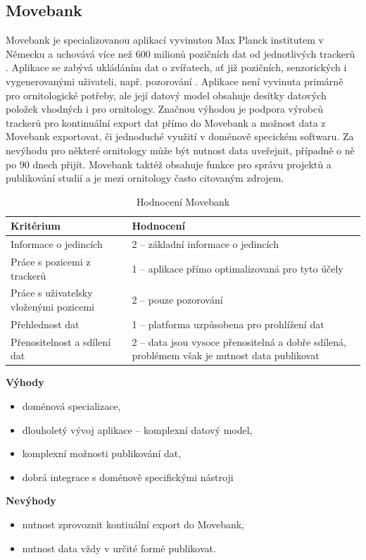 \subsection{Movebank}

Movebank je specializovanou aplikací vyvinutou Max Planck institutem v Německu a uchovává více než 600 milionů pozičních dat od jednotlivých trackerů  \cite{mrozewski2018movebank}. Aplikace se zabývá ukládáním dat o zvířatech, ať již pozičních, senzorických i vygenerovanými uživateli, např. pozorování \cite{kranstauber2011movebank}. Aplikace není vyvinuta primárně pro ornitologické potřeby, ale její datový model obsahuje desítky datových položek vhodných i pro ornitology. Značnou výhodou je podpora výrobců trackerů pro kontinuální export dat přímo do Movebank a možnost data z Movebank exportovat, či jednoduché využití v doménově specickém softwaru. Za nevýhodu pro některé ornitology může být nutnost data uveřejnit, případně o ně po 90 dnech přijít. Movebank taktéž obsahuje funkce pro správu projektů a publikování studií a je mezi ornitology často citovaným zdrojem.

\begin{table}[H]
	\begin{tabularx}{\textwidth}{ | X | X | }
		\hline
		Kritérium                              & Hodnocení \\
		\hline			
		Informace o jedincích                  & 2 -- základní informace o jedincích          \\
		\hline
		Práce s pozicemi z trackerů            & 1 -- aplikace přímo optimalizovaná pro tyto účely          \\
		\hline
		Práce s uživatelsky vloženými pozicemi & 2 -- pouze pozorování          \\
		\hline
		Přehlednost dat                        & 1 -- platforma uzpůsobena pro prohlížení dat          \\
		\hline
		Přenositelnost a sdílení dat           & 2 -- data jsou vysoce přenositelná a dobře sdílená, problémem však je nutnost data publikovat          \\
		\hline	
	\end{tabularx}
	\caption{Hodnocení Movebank}
\end{table}

\textbf{Výhody}
\begin{itemize}
	\item doménová specializace,
	\item dlouholetý vývoj aplikace -- komplexní datový model,
	\item komplexní možnosti publikování dat,
	\item dobrá integrace s doménově specifickými nástroji
\end{itemize}
\textbf{Nevýhody}
\begin{itemize}
	\item nutnost zprovoznit kontiuální export do Movebank,
	\item nutnost data vždy v určité formě publikovat.
\end{itemize}

